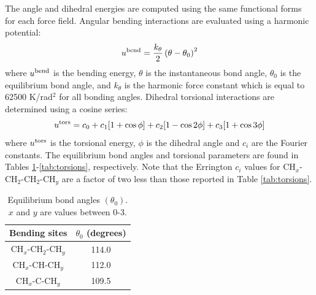 \documentclass[preprint,review,12pt]{elsarticle}
\begin{document}
	The angle and dihedral energies are computed using the same functional forms for each force field. Angular bending interactions are evaluated using a harmonic potential:
	\begin{equation}
	u^{\rm bend} = \frac{k_\theta}{2} \left(\theta-\theta_0\right)^2
	\end{equation}
	where $u^{\rm bend}$ is the bending energy, $\theta$ is the instantaneous bond angle, $\theta_0$ is the equilibrium bond angle, and $k_\theta$ is the harmonic force constant which is equal to 62500 K/rad$^2$ for all bonding angles. Dihedral torsional interactions are determined using a cosine series:
	\begin{equation}
	u^{\rm tors} = c_0 + c_1 [1+\cos{\phi}] + c_2 [1-\cos{2\phi}] + c_3 [1+\cos{3\phi}]
	\end{equation}
	where $u^{\rm tors}$ is the torsional energy, $\phi$ is the dihedral angle and $c_i$ are the Fourier constants. The equilibrium bond angles and torsional parameters are found in Tables \ref{tab:angles}-\ref{tab:torsions}, respectively. Note that the Errington $c_i$ values \cite{Exp6} for CH$_x$-CH$_2$-CH$_2$-CH$_y$ are a factor of two less than those reported in Table \ref{tab:torsions}. 
	\begin{table}[h!]
		\caption{Equilibrium bond angles $(\theta_0)$. $x$ and $y$ are values between 0-3.} \label{tab:angles}
		\begin{center}%
			\begin{tabular}{|c|c|}
				\hline
				Bending sites & $\theta_0$ (degrees) \\ \hline
				CH$_x$-CH$_2$-CH$_y$ & 114.0 \\ 
				CH$_x$-CH-CH$_y$ & 112.0 \\ 
				CH$_x$-C-CH$_y$ & 109.5 \\  
				\hline
			\end{tabular}
		\end{center} 
	\end{table}
	
\end{document}

